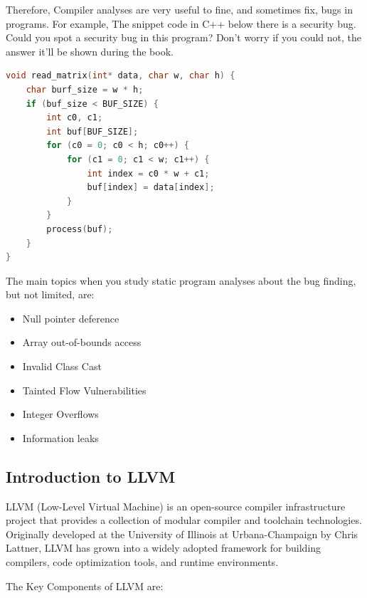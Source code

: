 Therefore, Compiler analyses are very useful to fine, and sometimes fix, bugs in programs. For example, The snippet code in C++ below there is a security bug. Could you spot a security bug in this program? Don't worry if you could not, the answer it'll be shown during the book.

\begin{lstlisting}[language=C++]
void read_matrix(int* data, char w, char h) {
    char burf_size = w * h;
    if (buf_size < BUF_SIZE) {
        int c0, c1;
        int buf[BUF_SIZE];
        for (c0 = 0; c0 < h; c0++) {
            for (c1 = 0; c1 < w; c1++) {
                int index = c0 * w + c1;
                buf[index] = data[index];
            }
        }
        process(buf);
    }
}
\end{lstlisting}

The main topics when you study static program analyses about the bug finding, but not limited, are:

\begin{itemize}
    \item Null pointer deference
    \item Array out-of-bounds access
    \item Invalid Class Cast
    \item Tainted Flow Vulnerabilities
    \item Integer Overflows
    \item Information leaks
\end{itemize}

\subsection{Introduction to LLVM}
\label{subsec:intro_llvm}

LLVM (Low-Level Virtual Machine) is an open-source compiler infrastructure project that provides a collection of modular compiler and toolchain technologies. Originally developed at the University of Illinois at Urbana-Champaign by Chris Lattner, LLVM has grown into a widely adopted framework for building compilers, code optimization tools, and runtime environments. 

The Key Components of LLVM are:

